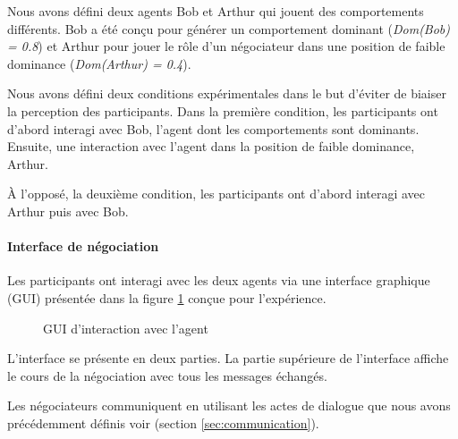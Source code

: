 {				Nous avons défini deux agents Bob et Arthur qui jouent des comportements différents. Bob a été conçu pour générer un comportement dominant (\textit{Dom(Bob) = 0.8}) et Arthur pour jouer le rôle d'un négociateur dans une position de faible dominance (\textit{Dom(Arthur) = 0.4}).
				
				Nous avons défini deux conditions expérimentales dans le but d'éviter de biaiser la perception des participants. Dans la première condition, les participants ont d'abord interagi avec Bob, l'agent dont les comportements sont dominants. Ensuite, une interaction avec l'agent dans la position de faible dominance, Arthur.
				
				À l'opposé, la deuxième condition, les participants ont d'abord interagi  avec Arthur puis avec Bob.
				
				
				\paragraph{Interface de négociation}			
					Les participants ont interagi avec les deux agents via une interface graphique (GUI) présentée dans la figure \ref{fig:ihm} conçue pour l'expérience. 
					
					\begin{figure}[t]
						\centering
						\caption{GUI d'interaction avec l'agent}
						\label{fig:ihm}
					\end{figure} 
				
				
					L'interface se présente en deux parties. La partie supérieure de l'interface affiche le cours de la négociation avec tous les messages échangés. 
					 
					Les négociateurs communiquent en utilisant les actes de dialogue que nous avons précédemment définis voir (section \ref {sec:communication}). 

}
